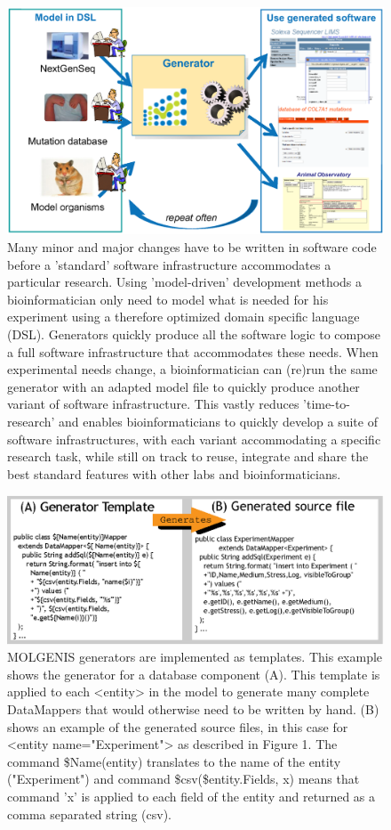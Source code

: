 \begin{figure}[h!]
  \centering
  \includegraphics[width=1.0\textwidth]{eps/image_4_1.eps}
  \caption[MOLGENIS]
    {Many minor and major changes have to be written in software code before a 'standard' software infrastructure 
    accommodates a particular research. Using 'model-driven' development methods a bioinformatician only need to 
    model what is needed for his experiment using a therefore optimized domain specific language (DSL). Generators 
    quickly produce all the software logic to compose a full software infrastructure that accommodates these needs. 
    When experimental needs change, a bioinformatician can (re)run the same generator with an adapted model file 
    to quickly produce another variant of software infrastructure. This vastly reduces 'time-to-research' and 
    enables bioinformaticians to quickly develop a suite of software infrastructures, with each variant accommodating 
    a specific research task, while still on track to reuse, integrate and share the best standard features with 
    other labs and bioinformaticians.}
\end{figure}

\begin{figure}[h!]
  \centering
  \includegraphics[width=1.0\textwidth]{eps/image_4_2.eps}
  \caption[Templates]
    {MOLGENIS generators are implemented as templates. This example shows the generator for a database component 
    (A). This template is applied to each <entity> in the model to generate many complete DataMappers that would 
    otherwise need to be written by hand. (B) shows an example of the generated source files, in this case for 
    <entity name="Experiment"> as described in Figure 1. The command \$Name(entity) translates to the name of the 
    entity ("Experiment") and command \${csv(\$entity.Fields, x)} means that command 'x' is applied to each field 
    of the entity and returned as a comma separated string (csv).}
\end{figure}

